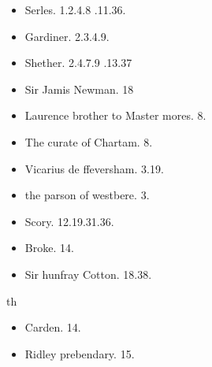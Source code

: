 \documentclass[12pt, a4paper]{book}
\begin{document}
            		
			 	\begin{itemize}
			 		\item[]Serles. 1.2.4.8
			.11.36.
			 		\item[]Gardiner. 2.3.4.9.
			 		\item[]Shether. 2.4.7.9
			.13.37
				 \end{itemize}
            			\begin{itemize}
            				\item[]Sir Jamis Newman. 18
            				\item[]Laurence brother to Master mores. 8.
            				\item[]The curate of Chartam. 8. 
            			\end{itemize}
			 

            		
            			
				\marginpar[\vspace{0.5cm}{\textcolor{Gray}{n}}]{}
			
            			\begin{itemize}
            				\item[]Vicarius de ffeversham. 3.19.
				\item[]the parson of westbere. 3.
            			\end{itemize}
            			\begin{itemize}
            				\item[]Scory. 12.19.31.36.
            				\item[]Broke. 14.
            			\end{itemize}
            		
			
				
				\marginpar[\vspace{0.5cm}{\textcolor{Gray}{th n}}]{}
			
				\begin{itemize}
					\item[]Sir hunfray Cotton. 18.38.
				\end{itemize}
				th
				\begin{itemize}
					\item[]Carden. 14.
					\item[]Ridley prebendary. 15.
				\end{itemize}
			
\end{document}
